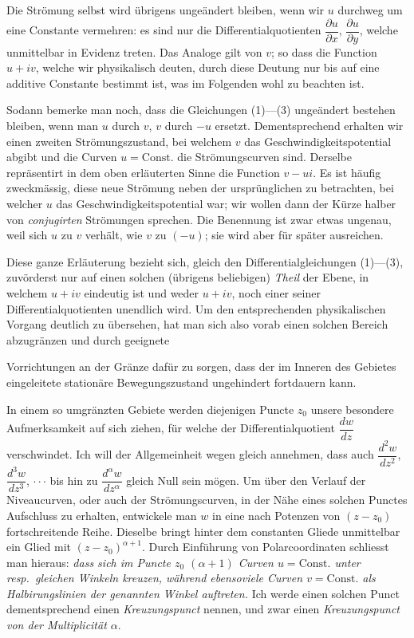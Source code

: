 \documentclass{article}
\begin{document}
Die Strömung selbst wird übrigens ungeändert bleiben, wenn wir $u$ durchweg um eine Constante vermehren: es sind nur die Differentialquotienten $\dfrac{\partial u}{\partial x}$, $\dfrac{\partial u}{\partial y}$, welche unmittelbar in Evidenz treten. Das Analoge gilt von $v$; so dass die Function $u + iv$, welche wir physikalisch deuten, durch diese Deutung nur bis auf eine additive Constante bestimmt ist, was im Folgenden wohl zu beachten ist.

Sodann bemerke man noch, dass die Gleichungen (1)---(3) ungeändert bestehen bleiben, wenn man $u$ durch $v$, $v$ durch $-u$ ersetzt. Dementsprechend erhalten wir einen zweiten Strömungszustand, bei welchem $v$ das Geschwindigkeitspotential abgibt und die Curven $u = \text{Const.}$ die Strömungscurven sind. Derselbe repräsentirt in dem oben erläuterten Sinne die Function $v - ui$. Es ist häufig zweckmässig, diese neue Strömung neben der ursprünglichen zu betrachten, bei welcher $u$ das Geschwindigkeitspotential war; wir wollen dann der Kürze halber von \emph{conjugirten} Strömungen sprechen. Die Benennung ist zwar etwas ungenau, weil sich $u$ zu $v$ verhält, wie $v$ zu $(-u)$; sie wird aber für später ausreichen.

Diese ganze Erläuterung bezieht sich, gleich den Differentialgleichungen (1)---(3), zuvörderst nur auf einen solchen (übrigens beliebigen) \emph{Theil} der Ebene, in welchem $u + iv$ eindeutig ist und weder $u + iv$, noch einer seiner Differentialquotienten unendlich wird. Um den entsprechenden physikalischen Vorgang deutlich zu übersehen, hat man sich also vorab einen solchen Bereich abzugränzen und durch geeignete

Vorrichtungen an der Gränze dafür zu sorgen, dass der im Inneren des Gebietes eingeleitete stationäre Bewegungszustand ungehindert fortdauern kann.

In einem so umgränzten Gebiete werden diejenigen Puncte $z_{0}$ unsere besondere Aufmerksamkeit auf sich ziehen, für welche der Differentialquotient $\dfrac{dw}{dz}$ verschwindet. Ich will der Allgemeinheit wegen gleich annehmen, dass auch $\dfrac{d^{2}w}{dz^{2}}$, $\dfrac{d^{3}w}{dz^{3}}$, $\cdot\cdot\cdot$ bis hin zu $\dfrac{d^{\alpha}w}{dz^{\alpha}}$ gleich Null sein mögen. Um über den Verlauf der Niveaucurven, oder auch der Strömungscurven, in der Nähe eines solchen Punctes Aufschluss zu erhalten, entwickele man $w$ in eine nach Potenzen von $(z - z_{0})$ fortschreitende Reihe. Dieselbe bringt hinter dem constanten Gliede unmittelbar ein Glied mit $(z - z_{0})^{\alpha + 1}$. Durch Einführung von Polarcoordinaten schliesst man hieraus: \emph{dass sich im Puncte $z_{0}$ $(\alpha + 1)$ Curven $u = \text{Const.}$ unter resp.\ gleichen Winkeln kreuzen, während ebensoviele Curven $v = \text{Const.}$ als Halbirungslinien der genannten Winkel auftreten.} Ich werde einen solchen Punct dementsprechend einen \emph{Kreuzungspunct} nennen, und zwar einen \emph{Kreuzungspunct von der Multiplicität $\alpha$}.
\end{document}

